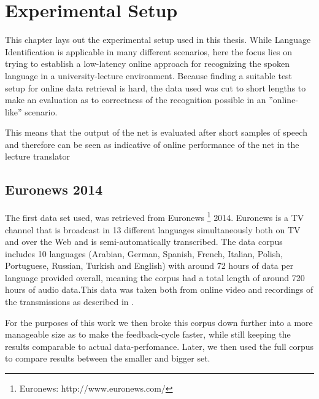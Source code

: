 



\chapter{Experimental Setup}
\label{ch:LITasks}

This chapter lays out the experimental setup used in this thesis. While Language Identification is applicable in many different scenarios, here the focus lies on trying to establish a low-latency online approach for recognizing the spoken language in a university-lecture environment. Because finding a suitable test setup for online data retrieval is hard, the data used was cut to short lengths to make an evaluation as to correctness of the recognition possible in an ''online-like'' scenario. 

This means that the output of the net is evaluated after short samples of speech and therefore can be seen as indicative of online performance of the net in the lecture translator

\section{Euronews 2014}
\label{sec:LITasks:Euronews}


The first data set used, was retrieved from Euronews \footnote{Euronews: http://www.euronews.com/} 2014. Euronews is a TV channel that is broadcast in 13 different languages simultaneously both on TV and over the Web and is semi-automatically transcribed. The data corpus includes 10 languages (Arabian, German, Spanish, French, Italian, Polish, Portuguese, Russian, Turkish and English) with around 72 hours of data per language provided overall, meaning the corpus had a total length of around 720 hours of audio data.This data was taken both from online video and recordings of the transmissions as described in \cite{gretter2014euronews}.

For the purposes of this work we then broke this corpus down further into a more manageable size as to make the feedback-cycle faster, while still keeping the results comparable to actual data-perfomance. Later, we then used the full corpus to compare results between the smaller and bigger set.

